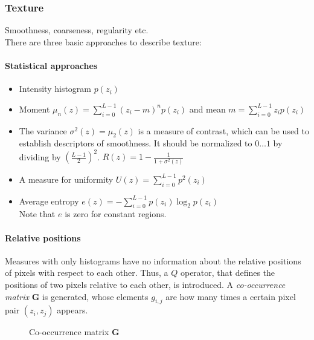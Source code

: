 \subsubsection{Texture}
Smoothness, coarseness, regularity etc.\\
There are three basic approaches to describe texture:\\

\paragraph{Statistical approaches}
\begin{itemize}
\item Intensity histogram $p(z_i)$
\item Moment $\mu_n(z)=\sum\limits_{i=0}^{L-1}(z_i-m)^np(z_i)$ and mean $m=\sum\limits_{i=0}^{L-1}z_ip(z_i)$
\item The variance $\sigma ^2(z) =\mu_2 (z)$ is a measure of contrast, which can be used to establish descriptors of smoothness. It should be normalized to $0 \ldots 1$ by dividing by $\left(\frac{L-1}{2}\right)^2$. $R(z)=1-\frac{1}{1+\sigma ^2(z)}$
\item A measure for uniformity $U(z)=\sum\limits_{i=0}^{L-1}p^2(z_i)$
\item Average entropy $e(z)=-\sum\limits_{i=0}^{L-1}p(z_i)\log_2p(z_i)$ \\ Note that $e$ is zero for constant regions.
\end{itemize}

\paragraph{Relative positions} Measures with only histograms have no information about the relative positions of pixels with respect to each other.
Thus, a $Q$ operator, that defines the positions of two pixels relative to each other, is introduced.
A \emph{co-occurrence matrix} $\mathbf{G}$ is generated, whose elements $g_{i,j}$ are how many times a certain pixel pair $(z_i,z_j)$ appears. \\

\begin{figure}[h]
	\centering
	
	\caption{Co-occurrence matrix $\mathbf{G}$}
\end{figure}


